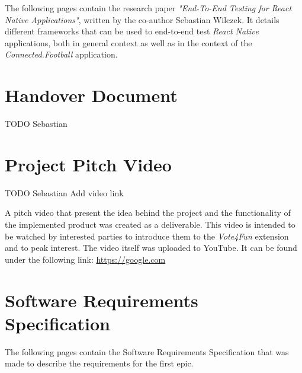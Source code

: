 \begin{appendices}
The following pages contain the research paper \textit{"End-To-End Testing for React Native Applications"}, written by the co-author Sebastian Wilczek. It details different frameworks that can be used to end-to-end test \textit{React Native} applications, both in general context as well as in the context of the \textit{Connected.Football} application.



\newpage

\section{Handover Document}
\label{appendix:handover_document}

TODO Sebastian


\newpage

\section{Project Pitch Video}
\label{appendix:pitch_video}

TODO Sebastian Add video link

A pitch video that present the idea behind the project and the functionality of the implemented product was created as a deliverable. This video is intended to be watched by interested parties to introduce them to the \textit{Vote4Fun} extension and to peak interest.
\newline
The video itself was uploaded to YouTube. It can be found under the following link: \url{https://google.com}

\newpage

\section{Software Requirements Specification}
\label{appendix:srs}

The following pages contain the Software Requirements Specification that was made to describe the requirements for the first epic.



\end{appendices}